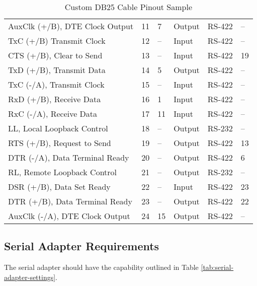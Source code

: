 \documentclass[]{article}
\begin{document}
\begin{landscape}
\begin{table}[h]
\begin{tabular}{@{}llllll@{}}
			AuxClk (+/B), DTE Clock Output & 11 & 7              & Output                       & RS-422 & -- \\
			\rowcolor[HTML]{EFEFEF} 
			TxC (+/B) Transmit Clock       & 12 & --             & {\color[HTML]{343434} Input} & RS-422 & -- \\
			\rowcolor[HTML]{C0C0C0} 
			CTS (+/B), Clear to Send       & 13 & --             & Input                        & RS-422 & 19 \\
			TxD (+/B), Transmit Data       & 14 & 5              & Output                       & RS-422 & -- \\
			\rowcolor[HTML]{EFEFEF} 
			TxC (-/A), Transmit Clock      & 15 & --             & {\color[HTML]{343434} Input} & RS-422 & -- \\
			RxD (+/B), Receive Data        & 16 & 1              & Input                        & RS-422 & -- \\
			RxC (-/A), Receive Data        & 17 & 11             & Input                        & RS-422 & -- \\
			\rowcolor[HTML]{C0C0C0} 
			LL, Local Loopback Control     & 18 & --             & Output                       & RS-232 & -- \\
			\rowcolor[HTML]{C0C0C0} 
			RTS (+/B), Request to Send     & 19 & --             & Output                       & RS-422 & 13 \\
			\rowcolor[HTML]{C0C0C0} 
			DTR (-/A), Data Terminal Ready & 20 & --             & Output                       & RS-422 & 6  \\
			\rowcolor[HTML]{C0C0C0} 
			RL, Remote Loopback Control    & 21 & --             & Output                       & RS-232 & -- \\
			\rowcolor[HTML]{C0C0C0} 
			DSR (+/B), Data Set Ready      & 22 & --             & Input                        & RS-422 & 23 \\
			\rowcolor[HTML]{C0C0C0} 
			DTR (+/B), Data Terminal Ready & 23 & --             & Output                       & RS-422 & 22 \\
			AuxClk (-/A), DTE Clock Output & 24 & 15             & Output                       & RS-422 & -- \\ \bottomrule
		\end{tabular}
		\caption{Custom DB25 Cable Pinout Sample}
		\label{tab:custom-db25-cable-pinout}
	\end{table}
\end{landscape}

\subsection{Serial Adapter Requirements}
The serial adapter should have the capability outlined in Table \ref{tab:serial-adapter-settings}.
\end{document}
